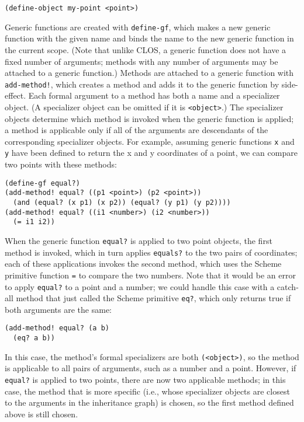 \documentclass{article}
\begin{document}
\begin{verbatim}
(define-object my-point <point>)
\end{verbatim}

Generic functions are created with \texttt{define-gf}, which makes a
new generic function with the given name and binds the name to the new 
generic function in the current scope.  (Note that unlike CLOS, a
generic function does not have a fixed number of arguments; methods
with any number of arguments may be attached to a generic function.)
Methods are attached to a generic function with \texttt{add-method!},
which creates a method and adds it to the generic function by side-effect.
Each formal argument to a method has both a name and a specializer
object.  (A specializer object can be omitted if it is
\texttt{<object>}.)  The specializer objects determine which method is 
invoked when the generic function is applied; a method is applicable
only if all of the arguments are descendants of the corresponding
specializer objects.  For example, assuming generic
functions \texttt{x} and \texttt{y} have been defined to return the x
and y coordinates of a point, we can compare two points with these
methods:

\begin{verbatim}
(define-gf equal?)
(add-method! equal? ((p1 <point>) (p2 <point>))
  (and (equal? (x p1) (x p2)) (equal? (y p1) (y p2))))
(add-method! equal? ((i1 <number>) (i2 <number>))
  (= i1 i2))
\end{verbatim}

When the generic function \texttt{equal?} is applied to two point
objects, the first method is invoked, which in turn applies
\texttt{equals?} to the two pairs of coordinates; each of
these applications invokes the second method, which uses the Scheme
primitive function \texttt{=} to compare the two numbers.
Note that it would be an error to apply \texttt{equal?} to a point and 
a number; we could handle this case with a catch-all method that just
called the Scheme primitive \texttt{eq?}, which only returns true if
both arguments are the same:

\begin{verbatim}
(add-method! equal? (a b)
  (eq? a b))
\end{verbatim}

In this case, the method's formal specializers are both
\texttt{(<object>)}, so the method is applicable to all pairs of
arguments, such as a number and a point.  However, if \texttt{equal?}
is applied to two points, there are now two applicable methods; in
this case, the method that is more specific (i.e., whose specializer
objects are closest to the arguments in the inheritance graph) is
chosen, so the first method defined above is still chosen.
\end{document}

